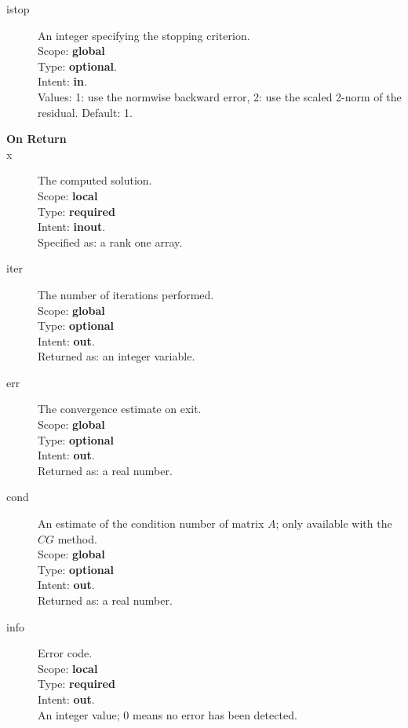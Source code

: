 \begin{description}
\item[istop]  An integer specifying the stopping criterion.\\
Scope: {\bf global} \\
Type: {\bf optional}.\\
Intent: {\bf in}.\\
Values: 1: use the normwise backward error, 2: use the scaled 2-norm
of the residual. Default: 1. 
\item[\bf On Return] 
\item[x] The computed solution. \\
Scope: {\bf local} \\
Type: {\bf required}\\
Intent: {\bf inout}.\\
Specified as: a rank one array.
\item[iter]  The number of iterations performed.\\
Scope: {\bf global} \\
Type: {\bf optional}\\
Intent: {\bf out}.\\
Returned  as: an integer variable.
\item[err]  The convergence estimate on exit.\\
Scope: {\bf global} \\
Type: {\bf optional}\\
Intent: {\bf out}.\\
Returned  as: a real number.
\item[cond]  An estimate of the condition number of matrix $A$; only
  available with the $CG$ method.\\
Scope: {\bf global} \\
Type: {\bf optional}\\
Intent: {\bf out}.\\
Returned  as: a real number.
\item[info] Error code.\\
Scope: {\bf local} \\
Type: {\bf required} \\
Intent: {\bf out}.\\
An integer value; 0 means no error has been detected. 
\end{description}



